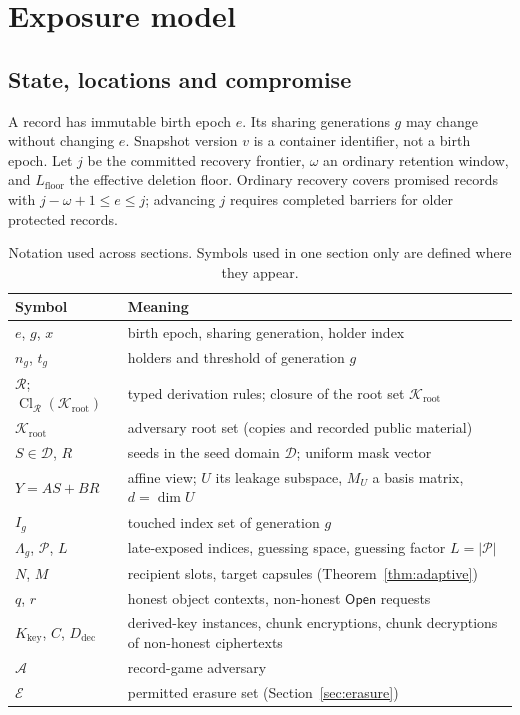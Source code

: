\documentclass[pdflatex,sn-mathphys-num]{sn-jnl}%
\theoremstyle{plain}
\theoremstyle{definition}
\newcommand{\Cl}{\operatorname{Cl}}
\begin{document}
\section{Exposure model}\label{sec:model}

\subsection{State, locations and compromise}
A record has immutable birth epoch $e$. Its sharing generations $g$ may change without changing $e$. Snapshot version $v$ is a container identifier, not a birth epoch. Let $j$ be the committed recovery frontier, $\omega$ an ordinary retention window, and $L_{\mathrm{floor}}$ the effective deletion floor. Ordinary recovery covers promised records with $j-\omega+1\le e\le j$; advancing $j$ requires completed barriers for older protected records.

\begin{table}[htbp]
\caption{Notation used across sections. Symbols used in one section only are defined where they appear.}\label{tab:notation}
\centering\footnotesize
\begin{tabularx}{\linewidth}{@{}>{\raggedright\arraybackslash}p{.27\linewidth}Y@{}}\toprule
Symbol & Meaning\\\midrule
$e$, $g$, $x$ & birth epoch, sharing generation, holder index\\
$n_g$, $t_g$ & holders and threshold of generation $g$\\
$\mathcal R$; $\Cl_{\mathcal R}(\mathcal K_{\mathrm{root}})$ & typed derivation rules; closure of the root set $\mathcal K_{\mathrm{root}}$\\
$\mathcal K_{\mathrm{root}}$ & adversary root set (copies and recorded public material)\\
$S\in\mathcal D$, $R$ & seeds in the seed domain $\mathcal D$; uniform mask vector\\
$Y=AS+BR$ & affine view; $U$ its leakage subspace, $M_U$ a basis matrix, $d=\dim U$\\
$I_g$ & touched index set of generation $g$\\
$\Lambda_g$, $\mathcal P$, $L$ & late-exposed indices, guessing space, guessing factor $L=|\mathcal P|$\\
$N$, $M$ & recipient slots, target capsules (Theorem~\ref{thm:adaptive})\\
$q$, $r$ & honest object contexts, non-honest $\mathsf{Open}$ requests\\
$K_{\mathrm{key}}$, $C$, $D_{\mathrm{dec}}$ & derived-key instances, chunk encryptions, chunk decryptions of non-honest ciphertexts\\
$\mathcal A$ & record-game adversary\\
$\mathcal E$ & permitted erasure set (Section~\ref{sec:erasure})\\\bottomrule
\end{tabularx}
\end{table}
\end{document}
